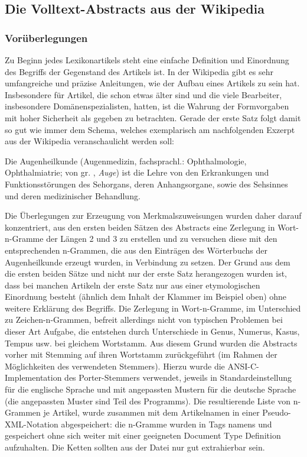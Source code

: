 \documentclass[pagesize,DIV=calc,12pt,draft]{scrreprt}
\begin{document}
\subsection{Die Volltext-Abstracts aus der Wikipedia}

\subsubsection{Vorüberlegungen}

Zu Beginn jedes Lexikonartikels steht eine einfache Definition und
Einordnung des Begriffs der Gegenstand des Artikels ist. In der
Wikipedia gibt es sehr umfangreiche und präzise Anleitungen, wie der
Aufbau eines Artikels zu sein hat. Insbesondere für Artikel, die schon
etwas älter sind und die viele Bearbeiter, insbesondere
Domänenspezialisten, hatten, ist die Wahrung der Formvorgaben mit hoher
Sicherheit als gegeben zu betrachten. Gerade der erste Satz folgt damit
so gut wie immer dem Schema, welches exemplarisch am nachfolgenden
Exzerpt aus der Wikipedia veranschaulicht werden soll:

\begin{description}
\itemsep1pt\parskip0pt
\item[Augenheilkunde]
Die Augenheilkunde (Augenmedizin, fachsprachl.: Ophthalmologie,
Ophthalmiatrie; von gr. \textomikron\textphi\texttheta\textalpha\textlambda\textmugreek\textomikron\textvarsigma, \emph{Auge}) ist die Lehre von den
Erkrankungen und Funktionsstörungen des Sehorgans, deren Anhangsorgane,
sowie des Sehsinnes und deren medizinischer Behandlung.
\end{description}

Die Überlegungen zur Erzeugung von Merkmalszuweisungen wurden daher
darauf konzentriert, aus den ersten beiden Sätzen des Abstracts eine
Zerlegung in Wort-n-Gramme der Längen 2 und 3 zu erstellen und zu
versuchen diese mit den entsprechenden n-Grammen, die aus den Einträgen
des Wörterbuchs der Augenheilkunde erzeugt wurden, in Verbindung zu
setzen. Der Grund aus dem die ersten beiden Sätze und nicht nur der
erste Satz herangezogen wurden ist, dass bei manchen Artikeln der erste
Satz nur aus einer etymologischen Einordnung besteht (ähnlich dem Inhalt
der Klammer im Beispiel oben) ohne weitere Erklärung des Begriffs. Die
Zerlegung in Wort-n-Gramme, im Unterschied zu Zeichen-n-Grammen, befreit
allerdings nicht von typischen Problemen bei dieser Art Aufgabe, die
entstehen durch Unterschiede in Genus, Numerus, Kasus, Tempus usw. bei
gleichem Wortstamm. Aus diesem Grund wurden die Abstracts vorher mit
Stemming auf ihren Wortstamm zurückgeführt (im Rahmen der Möglichkeiten
des verwendeten Stemmers). Hierzu wurde die ANSI-C-Implementation des
Porter-Stemmers verwendet, jeweils in Standardeinstellung für die
englische Sprache und mit angepassten Mustern für die deutsche Sprache
(die angepassten Muster sind Teil des Programms). Die resultierende
Liste von n-Grammen je Artikel, wurde zusammen mit dem Artikelnamen in
einer Pseudo-XML-Notation abgespeichert: die n-Gramme wurden in Tags
namens und gespeichert ohne sich weiter mit einer geeigneten Document
Type Definition aufzuhalten. Die Ketten sollten aus der Datei nur gut
extrahierbar sein.
\end{document}
